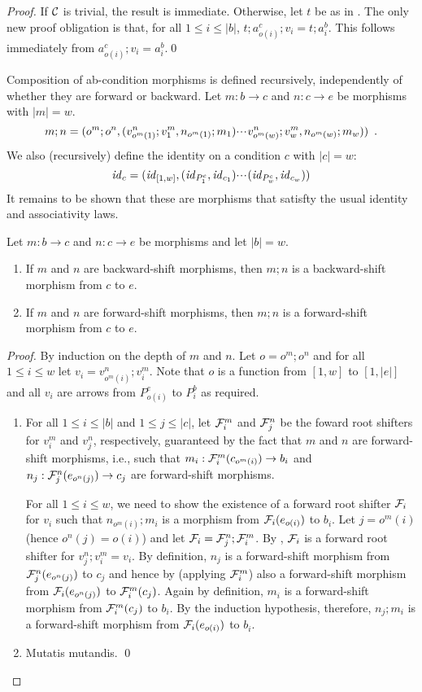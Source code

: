 \begin{proof}
If $\mathcal{C}$ is trivial, the result is immediate. Otherwise, let $t$ be as in . The only new proof obligation is that, for all $1\leq i\leq |b|$, $t;a^c_{o(i)};v_i=t;a^b_i$. This follows immediately from $a^c_{o(i)};v_i=a^b_i$.\qed
\end{proof}
%
Composition of ab-condition morphisms is defined recursively, independently of whether they are forward or backward. Let $m:b\to c$ and $n:c\to e$ be morphisms with $|m|=w$.
%
\[ m;n = (o^m;o^n,(v^n_{o^m(1)};v^m_1,n_{o^m(1)};m_1){\cdotp\mkern-2mu\cdotp\mkern-2mu\cdotp\mkern1mu} v^n_{o^m(w)};v^m_w,n_{o^m(w)};m_w)) \enspace.
\]
%
We also (recursively) define the identity on a condition $c$ with $|c|=w$:
%
\[ \mathit{id}_c = (\mathit{id}_{[1,w]},(\mathit{id}_{P^c_1},\mathit{id}_{c_1}){\cdotp\mkern-2mu\cdotp\mkern-2mu\cdotp\mkern1mu} (\mathit{id}_{P^c_w},\mathit{id}_{c_w})) \]
%
It remains to be shown that these are morphisms that satisfty the usual identity and associativity laws.
%
\begin{lemma}
Let $m:b\to c$ and $n:c\to e$ be morphisms and let $|b|=w$.
\begin{enumerate}[topsep=\smallskipamount]
\item If $m$ and $n$ are backward-shift morphisms, then $m;n$ is a backward-shift morphism from $c$ to $e$.
\item If $m$ and $n$ are forward-shift morphisms, then $m;n$ is a forward-shift morphism from $c$ to $e$.
\end{enumerate}
\end{lemma}

\begin{proof}
By induction on the depth of $m$ and $n$. Let $o=o^m;o^n$ and for all $1\leq i\leq w$ let $v_i=v^n_{o^m(i)};v^m_i$. Note that $o$ is a function from $[1,w]$ to $[1,|e|]$ and all $v_i$ are arrows from $P^e_{o(i)}$ to $P^b_i$ as required.
\begin{enumerate}
\item For all $1\leq i\leq |b|$ and $1\leq j\leq |c|$, let $\mathcal{F}^m_i$ and $\mathcal{F}^n_j$ be the foward root shifters for $v^m_i$ and $v^n_j$, respectively, guaranteed by the fact that $m$ and $n$ are forward-shift morphisms, i.e., such that $m_i:\mathcal{F}^m_i(c_{o^m(i)})\to b_i$ and $n_j:\mathcal{F}^n_j(e_{o^n(j)})\to c_j$ are forward-shift morphisms.

For all $1\leq i\leq w$, we need to show the existence of a forward root shifter $\mathcal{F}_i$ for $v_i$ such that $n_{o^m(i)};m_i$ is a morphism from $\mathcal{F}_i(e_{o(i)})$ to $b_i$. Let $j=o^m(i)$ (hence $o^n(j)=o(i)$) and let $\mathcal{F}_i=\mathcal{F}^n_j;\mathcal{F}^m_i$. By , $\mathcal{F}_i$ is a forward root shifter for $v^n_j;v^m_i=v_i$. By definition, $n_j$ is a forward-shift morphism from $\mathcal{F}^n_j(e_{o^n(j)})$ to $c_j$ and hence by  (applying $\mathcal{F}^m_i$) also a forward-shift morphism from $\mathcal{F}_i(e_{o^n(j)})$ to $\mathcal{F}^m_i(c_j)$. Again by definition, $m_i$ is a forward-shift morphism from $\mathcal{F}^m_i(c_j)$ to $b_i$. By the induction hypothesis, therefore, $n_j;m_i$ is a forward-shift morphism from $\mathcal{F}_i(e_{o(i)})$ to $b_i$.

\item Mutatis mutandis.
\qed
\end{enumerate}
\end{proof}

